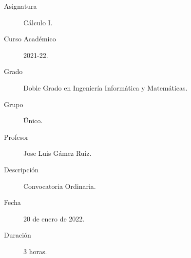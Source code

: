 \documentclass[12pt]{article}
\begin{document}

    
    

    
    \begin{description}
        \item[Asignatura] Cálculo I.
        \item[Curso Académico] 2021-22.
        \item[Grado] Doble Grado en Ingeniería Informática y Matemáticas.
        \item[Grupo] Único.
        \item[Profesor] Jose Luis Gámez Ruiz.
        \item[Descripción] Convocatoria Ordinaria.
        \item[Fecha] 20 de enero de 2022.
        \item[Duración] 3 horas.
    
    \end{description}
    \newpage
\end{document}
